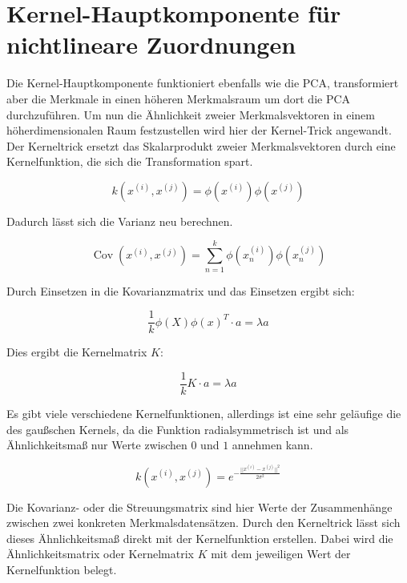 \documentclass[11pt]{article} %
\DeclareMathOperator{\Cov}{Cov}
\begin{document}
\section{Kernel-Hauptkomponente für nichtlineare Zuordnungen}
Die Kernel-Hauptkomponente funktioniert ebenfalls wie die PCA, transformiert aber die Merkmale in einen höheren Merkmalsraum um dort die PCA durchzuführen. Um nun die Ähnlichkeit zweier Merkmalsvektoren in einem höherdimensionalen Raum festzustellen wird hier der Kernel-Trick angewandt. \\
Der Kerneltrick ersetzt das Skalarprodukt zweier Merkmalsvektoren durch eine Kernelfunktion, die sich die Transformation spart.

\begin{equation}
k(x^{(i)}, x^{(j)}) = \phi(x^{(i)}) \phi(x^{(j)})
\end{equation} 

Dadurch lässt sich die Varianz neu berechnen.

\begin{equation}
\Cov(x^{(i)}, x^{(j)}) = \sum^k_{n=1} \phi(x_n^{(i)}) \phi(x_n^{(j)})
\end{equation}

Durch Einsetzen in die Kovarianzmatrix und das Einsetzen ergibt sich:

\begin{equation}
\frac{1}{k} \phi(X) \phi(x)^T \cdot a = \lambda a
\end{equation}

Dies ergibt die Kernelmatrix $K$:

\begin{equation}
\frac{1}{k} K \cdot a = \lambda a
\end{equation}

Es gibt viele verschiedene Kernelfunktionen, allerdings ist eine sehr geläufige die des gaußschen Kernels, da die Funktion radialsymmetrisch ist und als Ähnlichkeitsmaß nur Werte zwischen $0$ und $1$ annehmen kann.

\begin{equation}
k(x^{(i)}, x^{(j)}) = e^{-\frac{||x^{(i)} - x^{(j)}||^2}{2 \sigma^2}}
\end{equation} 

Die Kovarianz- oder die Streuungsmatrix sind hier Werte der Zusammenhänge zwischen zwei konkreten Merkmalsdatensätzen. Durch den Kerneltrick lässt sich dieses Ähnlichkeitsmaß direkt mit der Kernelfunktion erstellen. Dabei wird die Ähnlichkeitsmatrix oder Kernelmatrix $K$
mit dem jeweiligen Wert der Kernelfunktion belegt.
\end{document}
